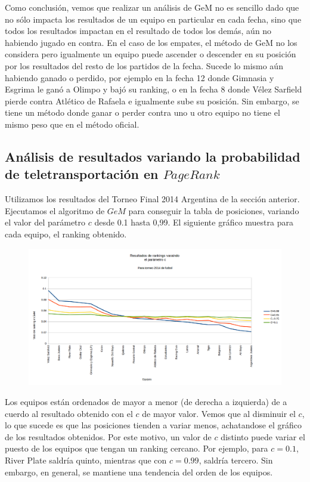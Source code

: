 Como conclusión, vemos que realizar un análisis de GeM no es sencillo dado que no sólo impacta los resultados de un equipo en particular en cada fecha, sino que todos los resultados impactan en el resultado de todos los demás, aún no habiendo jugado en contra. En el caso de los empates, el método de GeM no los considera pero igualmente un equipo puede ascender o descender en su posición por los resultados del resto de los partidos de la fecha. Sucede lo mismo aún habiendo ganado o perdido, por ejemplo en la fecha 12 donde Gimnasia y Esgrima le ganó a Olimpo y bajó su ranking, o en la fecha 8 donde Vélez Sarfield pierde contra Atlético de Rafaela e igualmente sube su posición. Sin embargo, se tiene un método donde ganar o perder contra uno u otro equipo no tiene el mismo peso que en el método oficial.


\subsection{Análisis de resultados variando la probabilidad de teletransportación en $PageRank$}

Utilizamos los resultados del Torneo Final 2014 Argentina de la sección anterior. Ejecutamos el algoritmo de $GeM$ para conseguir la tabla de posiciones, variando el valor del parámetro $c$ desde 0.1 hasta 0,99. El siguiente gráfico muestra para cada equipo, el ranking obtenido.\\

\begin{figure}[H]
\centering
\includegraphics[width=0.7\linewidth]{imagenes/varicionCfutbol2014Ordenado.png}
\end{figure}

Los equipos están ordenados de mayor a menor (de derecha a izquierda) de a cuerdo al resultado obtenido con el $c$ de mayor valor. Vemos que al disminuir el $c$, lo que sucede es que las posiciones tienden a variar menos, achatandose el gráfico de los resultados obtenidos.
Por este motivo, un valor de $c$ distinto puede variar el puesto de los equipos que tengan un ranking cercano. Por ejemplo, para $c=0.1$, River Plate saldría quinto, mientras que con $c=0.99$, saldría tercero. Sin embargo, en general, se mantiene una tendencia del orden de los equipos. 
